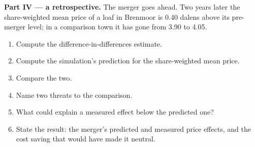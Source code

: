 \begin{problem}
\medskip\noindent\textbf{Part IV --- a retrospective.} The merger goes ahead. Two years later
the share-weighted mean price of a loaf in Brenmoor is 0.40 dalens above its pre-merger
level; in a comparison town it has gone from 3.90 to 4.05.
\begin{enumerate}[resume]
\item Compute the difference-in-differences estimate.
\item Compute the simulation's prediction for the share-weighted mean price.
\item Compare the two.
\item Name two threats to the comparison.
\item What could explain a measured effect below the predicted one?
\item State the result: the merger's predicted and measured price effects, and the cost
saving that would have made it neutral.
\end{enumerate}
\end{problem}

